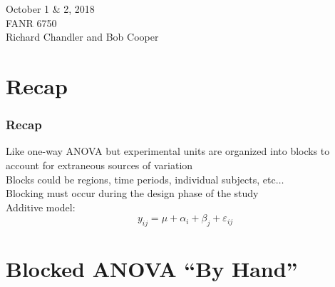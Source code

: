 \documentclass[color=usenames,dvipsnames]{beamer}\usepackage[]{graphicx}\usepackage[]{color}
\begin{document}




\begin{frame}[plain]
  \LARGE
  \centering \par
  {\color{RoyalBlue}{Lab 6 -- Randomized Complete Block Design \par}}
  \vspace{1cm}
  \large
  October 1 \& 2, 2018 \\
  FANR 6750 \\
  \vfill
  \large
  Richard Chandler and Bob Cooper
\end{frame}


\section{Recap}

\begin{frame}
  \frametitle{Recap}
  \large
  Like one-way ANOVA but experimental units are
  organized into blocks to account for extraneous sources of
  variation \\
      \pause
      \vfill
      Blocks could be regions, time periods, individual subjects,
      etc$\ldots$ \\
      \pause
      \vfill
      Blocking must occur during the design phase of the study \\
      \pause
      \vfill
      Additive model:
  \[
    y_{ij} = \mu + \alpha_i + \beta_j + \varepsilon_{ij}
  \]
\end{frame}


\section{Blocked ANOVA ``By Hand''}
\end{document}
